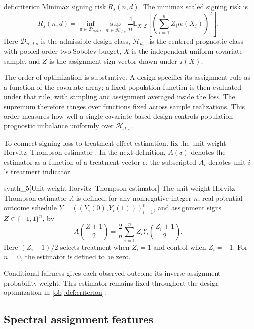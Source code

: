 \begin{definitionv}{def:criterion}[Minimax signing risk $R_s(n,d)$]
The minimax scaled signing risk is
\[
R_s(n,d)
=
\inf_{\pi\in\mathcal D_{n,d,s}}
\sup_{m\in\mathcal H_{d,s}}
\frac{4}{n}
\mathbb E_{X,Z}
\left[
\left(\sum_{i=1}^{n}Z_i m(X_i)\right)^2
\right].
\]
Here \(\mathcal D_{n,d,s}\) is the admissible design class, \(\mathcal H_{d,s}\) is the centered prognostic class with pooled order-two Sobolev budget, \(X\) is the independent uniform covariate sample, and \(Z\) is the assignment sign vector drawn under \(\pi(X)\).
\end{definitionv}

The order of optimization is substantive. A design specifies its assignment rule as a function of the covariate array; a fixed population function is then evaluated under that rule, with sampling and assignment averaged inside the loss. The supremum therefore ranges over functions fixed across sample realizations. This order measures how well a single covariate-based design controls population prognostic imbalance uniformly over \(\mathcal H_{d,s}\).

To connect signing loss to treatment-effect estimation, fix the unit-weight Horvitz--Thompson estimator \citep{Horvitz1952}. In the next definition, \(A(a)\) denotes the estimator as a function of a treatment vector \(a\); the subscripted \(A_i\) denotes unit \(i\)'s treatment indicator.

\begin{definitionv}{synth_5}[Unit-weight Horvitz--Thompson estimator]
The unit-weight Horvitz--Thompson estimator \(A\) is defined, for any nonnegative integer \(n\), real potential-outcome schedule \(Y=((Y_i(0),Y_i(1)))_{i=1}^n\), and assignment signs \(Z\in\{-1,1\}^n\), by
\[
A\!\left(\frac{Z+1}{2}\right)
=
\frac{2}{n}\sum_{i=1}^n Z_i
Y_i\!\left(\frac{Z_i+1}{2}\right).
\]
Here \((Z_i+1)/2\) selects treatment when \(Z_i=1\) and control when \(Z_i=-1\). For \(n=0\), the estimator is defined to be zero.
\end{definitionv}

Conditional fairness gives each observed outcome its inverse assignment-probability weight. This estimator remains fixed throughout the design optimization in \cref{obj:def:criterion}.

\subsection{Spectral assignment features}

